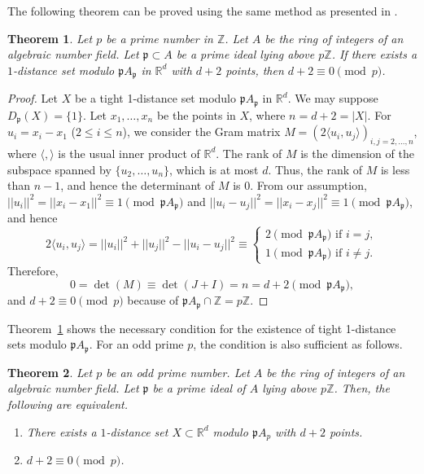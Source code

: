 \documentclass[a4paper, 11pt]{article}
\newcommand{\R}{\mathbb{R}}
\newcommand{\Z}{\mathbb{Z}}
\newcommand{\p}{\mathfrak{p}}
\newcommand{\la}{\langle}
\newcommand{\ra}{\rangle}
\newtheorem{theorem}{Theorem}[section]
\theoremstyle{definition}
\begin{document}
The following theorem can be proved using the same method as presented in \cite{R97}. 
\begin{theorem} \label{thm:gen_d+2}
Let $p$ be a prime number in $\Z$. 
Let $A$ be the ring of integers of an algebraic number field. 
Let $\p\subset A$ be a prime ideal lying above $p\Z$. 
If there exists a $1$-distance set modulo $\p A_\p$ in $\R^d$ with $d+2$ points, then $d+2\equiv 0 \pmod{p}$.   
\end{theorem}
\begin{proof}
Let $X$ be a tight 1-distance set modulo $\p A_\p$ in $\R^d$. 
We may suppose $D_\p(X)=\{1\}$. 
Let $x_1,\ldots, x_n$ be the points in $X$, where $n=d+2=|X|$. For $u_i=x_i-x_1$ ($2\leq i \leq n$), we consider the Gram matrix $M=(2 \langle u_i, u_j \rangle)_{i,j=2,\ldots, n}$, where $\la ,\ra$ is the usual inner product of $\mathbb{R}^d$. 
The rank of $M$ is the dimension of the subspace spanned by $\{u_2, \ldots, u_n\}$, which is at most $d$. 
Thus, the rank of $M$ is less than $n-1$, and hence the determinant of $M$ is 0. 
From our assumption, $||u_i||^2=||x_i-x_1||^2 \equiv 1 \pmod{\p A_\p}$ and $||u_i-u_j||^2=||x_i-x_j||^2\equiv 1 \pmod{\p A_\p}$, and hence 
\[
2\la u_i, u_j \ra =||u_i||^2+||u_j||^2-||u_i-u_j||^2\equiv \begin{cases}
2 \pmod{\p A_\p} \text{ if $i=j$},\\
1 \pmod{\p A_\p} \text{ if $i\ne j$}.
\end{cases}
\]
Therefore, 
\[
0=\det (M) \equiv \det (J+I)=n =d+2 \pmod{\p A_\p}, 
\]
and $d+2 \equiv 0 \pmod{p}$ because of $\p A_\p\cap \Z=p\Z$. 
\end{proof}
Theorem~\ref{thm:gen_d+2} shows the necessary condition for the existence of tight 1-distance sets modulo $\p A_\p$. For an odd prime $p$, the condition is also sufficient as follows. 
\begin{theorem} \label{thm:main_odd}
Let $p$ be an odd prime number. 
Let $A$ be the ring of integers of an algebraic number field. 
Let $\p$ be a prime ideal of $A$ lying above $p \Z$. 
Then, the following are equivalent. 
\begin{enumerate}
    \item There exists a $1$-distance set $X \subset \mathbb{R}^d$ modulo $\p A_p$ with $d+2$ points.
    \item $d+2\equiv 0 \pmod{p}$. 
\end{enumerate}
\end{theorem}
\end{document}
